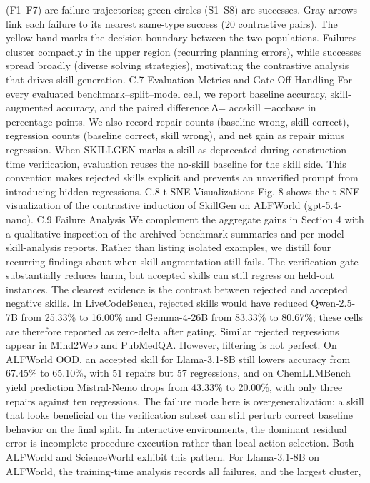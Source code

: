 (F1–F7) are failure trajectories; green circles (S1–S8) are successes. Gray arrows link each failure to
its nearest same-type success (20 contrastive pairs). The yellow band marks the decision boundary
between the two populations. Failures cluster compactly in the upper region (recurring planning
errors), while successes spread broadly (diverse solving strategies), motivating the contrastive analysis
that drives skill generation.
C.7
Evaluation Metrics and Gate-Off Handling
For every evaluated benchmark–split–model cell, we report baseline accuracy, skill-augmented
accuracy, and the paired difference ∆= accskill −accbase in percentage points. We also record repair
counts (baseline wrong, skill correct), regression counts (baseline correct, skill wrong), and net gain
as repair minus regression. When SKILLGEN marks a skill as deprecated during construction-time
verification, evaluation reuses the no-skill baseline for the skill side. This convention makes rejected
skills explicit and prevents an unverified prompt from introducing hidden regressions.
C.8
t-SNE Visualizations
Fig. 8 shows the t-SNE visualization of the contrastive induction of SkillGen on ALFWorld (gpt-5.4-
nano).
C.9
Failure Analysis
We complement the aggregate gains in Section 4 with a qualitative inspection of the archived
benchmark summaries and per-model skill-analysis reports. Rather than listing isolated examples, we
distill four recurring findings about when skill augmentation still fails.
The verification gate substantially reduces harm, but accepted skills can still regress on held-out
instances.
The clearest evidence is the contrast between rejected and accepted negative skills. In
LiveCodeBench, rejected skills would have reduced Qwen-2.5-7B from 25.33\% to 16.00\% and
Gemma-4-26B from 83.33\% to 80.67\%; these cells are therefore reported as zero-delta after gating.
Similar rejected regressions appear in Mind2Web and PubMedQA. However, filtering is not perfect.
On ALFWorld OOD, an accepted skill for Llama-3.1-8B still lowers accuracy from 67.45\% to
65.10\%, with 51 repairs but 57 regressions, and on ChemLLMBench yield prediction Mistral-Nemo
drops from 43.33\% to 20.00\%, with only three repairs against ten regressions. The failure mode here
is overgeneralization: a skill that looks beneficial on the verification subset can still perturb correct
baseline behavior on the final split.
In interactive environments, the dominant residual error is incomplete procedure execution
rather than local action selection.
Both ALFWorld and ScienceWorld exhibit this pattern. For
Llama-3.1-8B on ALFWorld, the training-time analysis records all failures, and the largest cluster,
